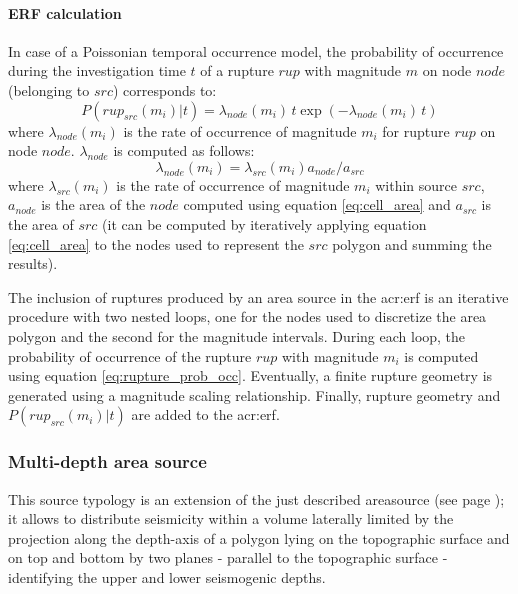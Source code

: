 \paragraph{ERF calculation}
\label{par:erf_calc_area_src}
In case of a Poissonian temporal occurrence model, the probability of 
occurrence during the investigation time $t$ of a rupture $rup$ with 
magnitude $m$ on node $node$ (belonging to $src$) corresponds to:
\begin{equation}
P(rup_{src}(m_i)|t)=\lambda_{node}(m_i)\,t\exp(-\lambda_{node}(m_i)\,t)
\label{eq:rupture_prob_occ}
\end{equation}
where $\lambda_{node}(m_i)$ is the rate of occurrence of magnitude $m_i$ 
for rupture $rup$ on node $node$. $\lambda_{node}$ is computed as follows:
\[ 
\lambda_{node}(m_i) = \lambda_{src}(m_i)a_{node}/a_{src}
\]
%
where $\lambda_{src}(m_i)$ is the rate of occurrence of magnitude $m_i$
within source $src$, $a_{node}$ is the area of the $node$ computed using
equation \ref{eq:cell_area} and $a_{src}$ is the area of $src$ (it can be
computed by iteratively applying equation \ref{eq:cell_area} to the 
nodes used to represent the $src$ polygon and summing the results). 

The inclusion of ruptures produced by an area source in the 
\gls{acr:erf} is an iterative procedure with two nested loops, one 
for the nodes used to discretize the area polygon and the second for 
the magnitude intervals. 
%
During each loop, the probability of occurrence of the rupture $rup$
with magnitude $m_i$ is computed using equation \ref{eq:rupture_prob_occ}.
Eventually, a finite rupture geometry is generated using a magnitude 
scaling relationship. Finally, rupture geometry and $P(rup_{src}(m_i)|t)$
are added to the \gls{acr:erf}.
%
\subsubsection{Multi-depth area source}
%
%
This source typology is an extension of the just described 
\gls{areasource} (see page \pageref{sec:areasource});
it allows to distribute seismicity within a volume laterally 
limited by the projection along the depth-axis of a polygon 
lying on the topographic surface and on top and bottom by 
two planes - parallel to the topographic surface - identifying the 
upper and lower seismogenic depths.


